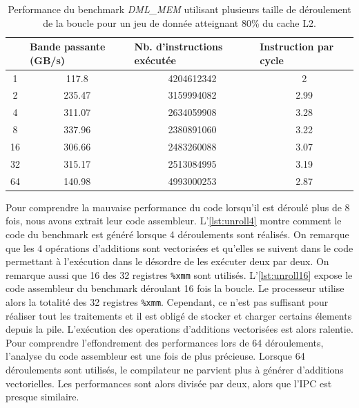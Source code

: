     \begin{table}[]
    \centering
    \begin{tabular}{|c|c|c|c|}
    \hline
    \rowcolor[HTML]{EFEFEF} 
    \multicolumn{1}{|l|}{\cellcolor[HTML]{EFEFEF}Nb. de déroulements} & \multicolumn{1}{l|}{\cellcolor[HTML]{EFEFEF}Bande passante (GB/s)} & \multicolumn{1}{l|}{\cellcolor[HTML]{EFEFEF}Nb. d'instructions exécutée} & \multicolumn{1}{l|}{\cellcolor[HTML]{EFEFEF}Instruction par cycle} \\ \hline
    1 & 117.8 & 4204612342 & 2 \\ \hline
    2 & 235.47 & 3159994082 & 2.99 \\ \hline
    4 & 311.07 & 2634059908 & 3.28 \\ \hline
    8 & 337.96 & 2380891060 & 3.22 \\ \hline
    16 & 306.66 & 2483260088 & 3.07 \\ \hline
    32 & 315.17 & 2513084995 & 3.19 \\ \hline
    64 & 140.98 & 4993000253 & 2.87 \\ \hline
    \end{tabular}%
    \caption{Performance du benchmark \textit{DML\_MEM} utilisant plusieurs taille de déroulement de la boucle pour un jeu de donnée atteignant 80\% du cache L2.}
    \label{tab:dml_unroll_bench}
    \end{table}
    
    Pour comprendre la mauvaise performance du code lorsqu'il est déroulé plus de 8 fois, nous avons extrait leur code assembleur. L'\autoref{lst:unroll4} montre comment le code du benchmark est généré lorsque 4 déroulements sont réalisés. On remarque que les 4 opérations d'additions sont vectorisées et qu'elles se suivent dans le code permettant à l'exécution dans le désordre de les exécuter deux par deux. On remarque aussi que 16 des 32 registres \verb|%xmm| sont utilisés. L'\autoref{lst:unroll16} expose le code assembleur du benchmark déroulant 16 fois la boucle. Le processeur utilise alors la totalité des 32 registres \verb|%xmm|. Cependant, ce n'est pas suffisant pour réaliser tout les traitements et il est obligé de stocker et charger certains élements depuis la pile. L'exécution des operations d'additions vectorisées est alors ralentie. Pour comprendre l'effondrement des performances lors de 64 déroulements, l'analyse du code assembleur est une fois de plus précieuse. Lorsque 64 déroulements sont utilisés, le compilateur ne parvient plus à générer d'additions vectorielles. Les performances sont alors divisée par deux, alors que l'IPC est presque similaire. 
    

